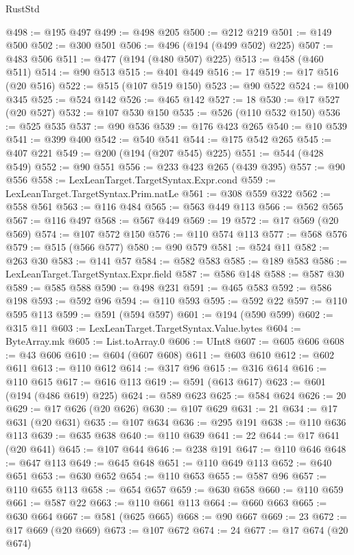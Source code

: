 \begin{lexlean}{RustStd}
\begin{coremodule}
{\begin{coremodule}
{{{{{{{{{{{{{{{{{{{{{{{{{{{{{{{{{{{{{{{{{{{{{@498 := @195 @497
@499 := @498 @205
@500 := @212 @219
@501 := @149 @500
@502 := @300 @501
@506 := @496 (@194 (@499 @502) @225)
@507 := @483 @506
@511 := @477 (@194 (@480 @507) @225)
@513 := @458 (@460 @511)
@514 := @90 @513
@515 := @401 @449
@516 := 17
@519 := @17 @516 (@20 @516)
@522 := @515 (@107 @519 @150)
@523 := @90 @522
@524 := @100 @345
@525 := @524 @142
@526 := @465 @142
@527 := 18
@530 := @17 @527 (@20 @527)
@532 := @107 @530 @150
@535 := @526 (@110 @532 @150)
@536 := @525 @535
@537 := @90 @536
@539 := @176 @423 @265
@540 := @10 @539
@541 := @399 @400
@542 := @540 @541
@544 := @175 @542 @265
@545 := @407 @221
@549 := @200 (@194 (@207 @545) @225)
@551 := @544 (@428 @549)
@552 := @90 @551
@556 := @233 @423 @265 (@439 @395)
@557 := @90 @556
@558 := LexLeanTarget.TargetSyntax.Expr.cond
@559 := LexLeanTarget.TargetSyntax.Prim.natLe
@561 := @308 @559 @322
@562 := @558 @561
@563 := @116 @484
@565 := @563 @449 @113
@566 := @562 @565
@567 := @116 @497
@568 := @567 @449
@569 := 19
@572 := @17 @569 (@20 @569)
@574 := @107 @572 @150
@576 := @110 @574 @113
@577 := @568 @576
@579 := @515 (@566 @577)
@580 := @90 @579
@581 := @524 @11
@582 := @263 @30
@583 := @141 @57
@584 := @582 @583
@585 := @189 @583
@586 := LexLeanTarget.TargetSyntax.Expr.field
@587 := @586 @148
@588 := @587 @30
@589 := @585 @588
@590 := @498 @231
@591 := @465 @583
@592 := @586 @198
@593 := @592 @96
@594 := @110 @593
@595 := @592 @22
@597 := @110 @595 @113
@599 := @591 (@594 @597)
@601 := @194 (@590 @599)
@602 := @315 @11
@603 := LexLeanTarget.TargetSyntax.Value.bytes
@604 := ByteArray.mk
@605 := List.toArray.{0}
@606 := UInt8
@607 := @605 @606
@608 := @43 @606
@610 := @604 (@607 @608)
@611 := @603 @610
@612 := @602 @611
@613 := @110 @612
@614 := @317 @96
@615 := @316 @614
@616 := @110 @615
@617 := @616 @113
@619 := @591 (@613 @617)
@623 := @601 (@194 (@486 @619) @225)
@624 := @589 @623
@625 := @584 @624
@626 := 20
@629 := @17 @626 (@20 @626)
@630 := @107 @629
@631 := 21
@634 := @17 @631 (@20 @631)
@635 := @107 @634
@636 := @295 @191
@638 := @110 @636 @113
@639 := @635 @638
@640 := @110 @639
@641 := 22
@644 := @17 @641 (@20 @641)
@645 := @107 @644
@646 := @238 @191
@647 := @110 @646
@648 := @647 @113
@649 := @645 @648
@651 := @110 @649 @113
@652 := @640 @651
@653 := @630 @652
@654 := @110 @653
@655 := @587 @96
@657 := @110 @655 @113
@658 := @654 @657
@659 := @630 @658
@660 := @110 @659
@661 := @587 @22
@663 := @110 @661 @113
@664 := @660 @663
@665 := @630 @664
@667 := @581 (@625 @665)
@668 := @90 @667
@669 := 23
@672 := @17 @669 (@20 @669)
@673 := @107 @672
@674 := 24
@677 := @17 @674 (@20 @674)
}}}}}}}}}}}}}}}}}}}}}}}}}}}}}}}}}}}}}}}}}}}}}
\end{coremodule}}
\end{coremodule}
\end{lexlean}

